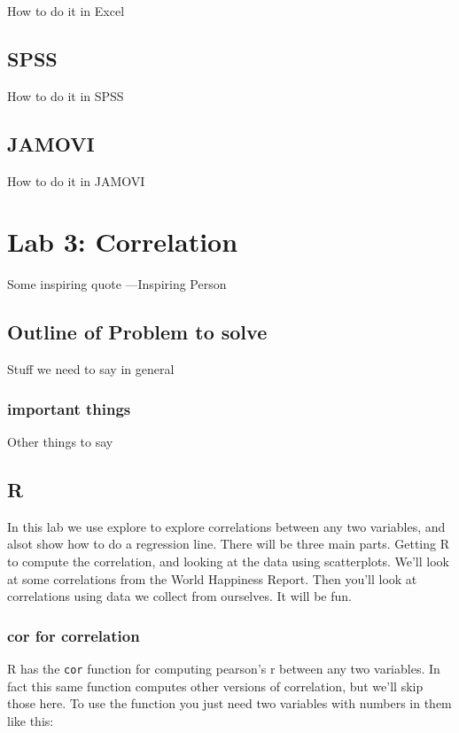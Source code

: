 \documentclass[]{book}
\theoremstyle{definition}
\theoremstyle{definition}
\theoremstyle{definition}
\theoremstyle{remark}
\begin{document}
How to do it in Excel

\section{SPSS}\label{spss-1}

How to do it in SPSS

\section{JAMOVI}\label{jamovi-1}

How to do it in JAMOVI

\chapter{Lab 3: Correlation}\label{lab-3-correlation}

{ Some inspiring quote ---Inspiring Person }

\section{Outline of Problem to
solve}\label{outline-of-problem-to-solve-1}

Stuff we need to say in general

\subsection{important things}\label{important-things-1}

Other things to say

\section{R}\label{r-3}

In this lab we use explore to explore correlations between any two
variables, and alsot show how to do a regression line. There will be
three main parts. Getting R to compute the correlation, and looking at
the data using scatterplots. We'll look at some correlations from the
World Happiness Report. Then you'll look at correlations using data we
collect from ourselves. It will be fun.

\subsection{cor for correlation}\label{cor-for-correlation}

R has the \texttt{cor} function for computing pearson's r between any
two variables. In fact this same function computes other versions of
correlation, but we'll skip those here. To use the function you just
need two variables with numbers in them like this:
\end{document}
